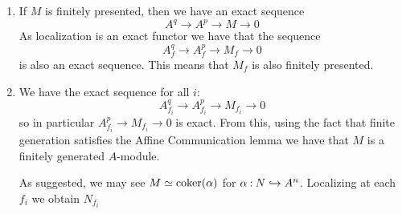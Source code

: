 \documentclass[12pt]{memoir}
\begin{document}
\begin{ptcbr}
    \begin{enumerate}
        \itemsep=-0.4em
        \item If $M$ is finitely presented, then we have an exact sequence 
        $$A^q\to A^p\to M\to 0$$
        As localization is an exact functor we have that the sequence 
        $$A^q_f\to A^p_f\to M_f\to 0$$
        is also an exact sequence. This means that $M_f$ is also finitely presented.
        \item We have the exact sequence for all $i$:
        $$A^q_{f_i}\to A^p_{f_i}\to M_{f_i}\to 0$$
        so in particular $A^p_{f_i}\to M_{f_i}\to 0$ is exact. From this, using the fact that finite generation satisfies the Affine Communication lemma we have that $M$ is a finitely generated $A$-module.\par 
        As suggested, we may see $M\simeq\operatorname{coker}(\alpha)$ for $\alpha\mathbin{:} N\hookrightarrow A^n$. Localizing at each $f_i$ we obtain $N_{f_i}$
    \end{enumerate}
\end{ptcbr}
\end{document}
